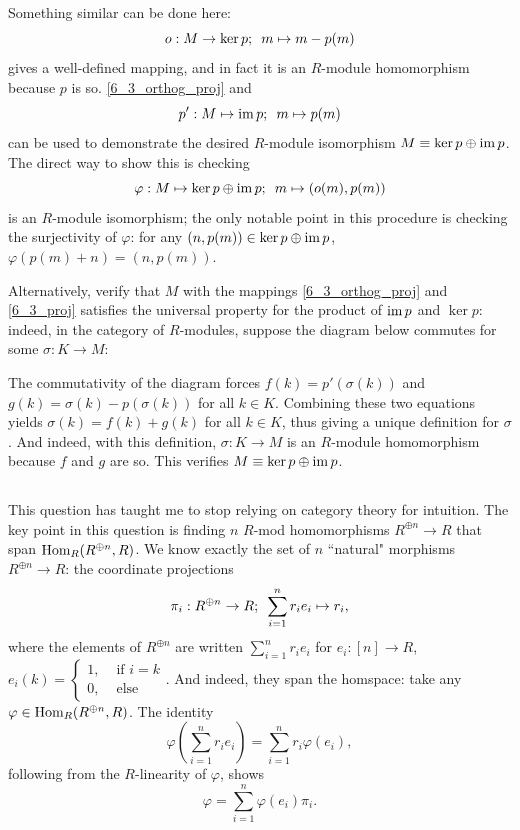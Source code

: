 \documentclass[12pt]{article}
\begin{document}
Something similar can be done here: 
\begin{equation} \label{6_3_orthog_proj}
  o: M \rightarrow \ker p; \hspace{0.5em} m \mapsto m - p(m)
\end{equation}
gives a well-defined mapping, and in fact it is an $R$-module homomorphism because $p$ is so. 
\eqref{6_3_orthog_proj} and 
\begin{equation} \label{6_3_proj}
  p': M \mapsto \operatorname{im} p; \hspace{0.5em} m \mapsto p(m)
\end{equation}
can be used to demonstrate the desired $R$-module isomorphism $M \equiv \ker p \oplus \im p$. 
The direct way to show this is checking 
$$\varphi: M \mapsto \ker p \oplus \operatorname{im} p; \hspace{0.5em} m \mapsto (o(m), p(m))$$
is an $R$-module isomorphism; 
the only notable point in this procedure is checking the surjectivity of $\varphi$: 
for any $(n, p(m)) \in \ker p \oplus \operatorname{im} p$, $\varphi(p(m) + n) = (n, p(m))$. 

Alternatively, verify that $M$ with the mappings \eqref{6_3_orthog_proj} and \eqref{6_3_proj} satisfies the universal property for the product of $\operatorname{im} p$ and $\ker p$: 
indeed, in the category of $R$-modules, suppose the diagram below commutes for some $\sigma: K \rightarrow M$: 
\begin{center}
\end{center}
The commutativity of the diagram forces $f(k) = p'(\sigma(k))$ and $g(k) = \sigma(k) - p(\sigma(k))$ for all $k \in K$. 
Combining these two equations yields $\sigma(k) = f(k) + g(k)$ for all $k \in K$, thus giving a unique definition for $\sigma$. 
And indeed, with this definition, $\sigma: K \rightarrow M$ is an $R$-module homomorphism because $f$ and $g$ are so. 
This verifies $M \equiv \ker p \oplus \im p$. 

\newcommand{\rsum}{R^{\oplus n}}
\setcounter{subsection}{5}
\subsection{}
This question has taught me to stop relying on category theory for intuition. 
The key point in this question is finding $n$ $R$-mod homomorphisms $\rsum \rightarrow R$ that span $\homspace{R}{\rsum}{R}$. 
We know exactly the set of $n$ ``natural" morphisms $\rsum \rightarrow R$: 
the coordinate projections 
$$\pi_{i}: \rsum \rightarrow R; \hspace{0.5em} \sum_{i = 1}^{n} r_i e_i \mapsto r_i,$$
where the elements of $\rsum$ are written $\sum_{i = 1}^{n} r_i e_i$ for $e_i: [n] \rightarrow R$, $e_i(k) = \begin{cases} 1, & \text{ if } i = k \\ 0, & \text{ else} \end{cases}$. 
And indeed, they span the homspace:  
take any $\varphi \in \homspace{R}{\rsum}{R}$. 
The identity 
$$\varphi(\sum_{i = 1}^{n} r_i e_i) = \sum_{i = 1}^{n} r_i \varphi(e_i),$$
following from the $R$-linearity of $\varphi$, shows 
$$\varphi = \sum_{i = 1}^{n} \varphi(e_i) \pi_{i}.$$
\end{document}
